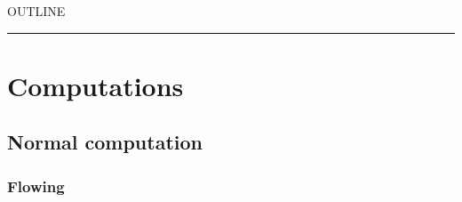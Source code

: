 


    OUTLINE
  \tableofcontents
\begin{center}
\rule{3in}{0.4pt}
\end{center}

\section{Computations}\hypertarget{computations}{}\label{computations}

\subsection{Normal computation}\hypertarget{normal-computation}{}\label{normal-computation}

\subsubsection{Flowing}\hypertarget{flowing}{}\label{flowing}

\begin{align*}
  [ \
  \KEY{Funcon} \quad & \NAMEHYPER{../../../../../Funcons-beta/Computations/Normal}{Flowing}{left-to-right} \\
  \KEY{Alias} \quad & \NAMEHYPER{../../../../../Funcons-beta/Computations/Normal}{Flowing}{l-to-r} \\
  \KEY{Funcon} \quad & \NAMEHYPER{../../../../../Funcons-beta/Computations/Normal}{Flowing}{sequential} \\
  \KEY{Alias} \quad & \NAMEHYPER{../../../../../Funcons-beta/Computations/Normal}{Flowing}{seq} \\
  \KEY{Funcon} \quad & \NAMEHYPER{../../../../../Funcons-beta/Computations/Normal}{Flowing}{effect} \\
  \KEY{Funcon} \quad & \NAMEHYPER{../../../../../Funcons-beta/Computations/Normal}{Flowing}{if-true-else} \\
  \KEY{Alias} \quad & \NAMEHYPER{../../../../../Funcons-beta/Computations/Normal}{Flowing}{if-else} \\
  \KEY{Funcon} \quad & \NAMEHYPER{../../../../../Funcons-beta/Computations/Normal}{Flowing}{while-true} \\
  \KEY{Alias} \quad & \NAMEHYPER{../../../../../Funcons-beta/Computations/Normal}{Flowing}{while} \\
  \KEY{Funcon} \quad & \NAMEHYPER{../../../../../Funcons-beta/Computations/Normal}{Flowing}{atomic}
  \ ]
\end{align*}
